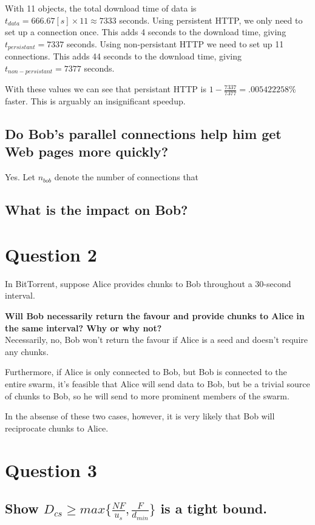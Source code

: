\documentclass[a4paper]{article}
\begin{document}
With 11 objects, the total download time of data is $t_{data} = \unit{666.67}[s] \times 11 \approx 7333$ seconds.
Using persistent HTTP, we only need to set up a connection once. This adds 4 seconds to the download time, giving $t_{persistant} = 7337$ seconds. 
Using non-persistant HTTP we need to set up 11 connections. This adds 44 seconds to the download time, giving $t_{non-persistant} = 7377$ seconds.

With these values we can see that persistant HTTP is $1 - \frac{7337}{7377} = .005422258\%$ faster. This is arguably an insignificant speedup.


\subsection{Do Bob’s parallel connections help him get Web pages more quickly?}

Yes. Let $n_{bob}$ denote the number of connections that 

\subsection{What is the impact on Bob?}

\section{Question 2}
In BitTorrent, suppose Alice provides chunks to Bob throughout a 30-second interval. 

\textbf{Will Bob necessarily return the favour and provide chunks to Alice in the same interval? Why or why not?} \\

Necessarily, no, Bob won't return the favour if Alice is a seed and doesn't require any chunks.

Furthermore, if Alice is only connected to Bob, but Bob is connected to the entire swarm, it's feasible that Alice will send data to Bob, but be a trivial source of chunks to Bob, so he will send to more prominent members of the swarm.

In the absense of these two cases, however, it is very likely that Bob will reciprocate chunks to Alice.




\section{Question 3}
\subsection{Show $D_{cs} \geq max\{ \frac{NF}{u_{s}}, \frac{F}{d_{min}} \} $ is a tight bound.}
\end{document}
